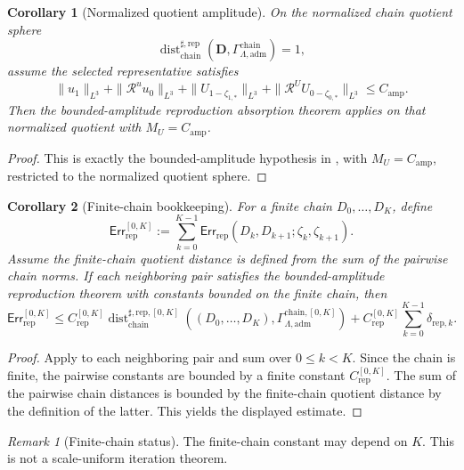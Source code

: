 \documentclass[11pt]{article}
\numberwithin{equation}{section}
\newtheorem{corollary}[corollary]{Corollary}
\theoremstyle{definition}
\theoremstyle{remark}
\newtheorem{remark}[remark]{Remark}
\newcommand{\adm}{\mathrm{adm}}
\newcommand{\rep}{\mathrm{rep}}
\newcommand{\chain}{\mathrm{chain}}
\newcommand{\Err}{\mathsf{Err}}
\newcommand{\Dist}{\operatorname{dist}}
\newcommand{\calR}{\mathcal R}
\newcommand{\bD}{\mathbf D}
\newcommand{\Gchain}{\Gamma_{\Lambda,\adm}^{\chain}}
\begin{document}
\begin{corollary}[Normalized quotient amplitude]
\label{rep:cor:normalized-chain-amplitude}
On the normalized chain quotient sphere
\[
    \Dist_{\chain}^{\sharp,\rep}(\bD,\Gchain)=1,
\]
assume the selected representative satisfies
\[
    \|u_1\|_{L^3}
    +
    \|\calR^u u_0\|_{L^3}
    +
    \|U_{1-\zeta_{1,*}}\|_{L^3}
    +
    \|\calR^U U_{0-\zeta_{0,*}}\|_{L^3}
    \le
    C_{\mathrm{amp}}.
\]
Then the bounded-amplitude reproduction absorption theorem applies on that
normalized quotient
with \(M_U=C_{\mathrm{amp}}\).
\end{corollary}

\begin{proof}
This is exactly the bounded-amplitude hypothesis in
, with
\(M_U=C_{\mathrm{amp}}\), restricted to the normalized quotient sphere.
\end{proof}

\begin{corollary}[Finite-chain bookkeeping]
\label{rep:cor:finite-chain-bookkeeping}
For a finite chain \(D_0,\ldots,D_K\), define
\[
    \Err_{\rep}^{[0,K]}
    :=
    \sum_{k=0}^{K-1}
    \Err_{\rep}(D_k,D_{k+1};\zeta_k,\zeta_{k+1}).
\]
Assume the finite-chain quotient distance is defined from the sum of the
pairwise chain norms.  If each neighboring pair satisfies the
bounded-amplitude reproduction theorem with constants bounded on the finite
chain, then
\[
    \Err_{\rep}^{[0,K]}
    \le
    C_{\rep}^{[0,K]}
    \Dist_{\chain}^{\sharp,\rep,[0,K]}
    ((D_0,\ldots,D_K),\Gamma_{\Lambda,\adm}^{\chain,[0,K]})
    +
    C_{\rep}^{[0,K]}
    \sum_{k=0}^{K-1}\delta_{\rep,k}.
\]
\end{corollary}

\begin{proof}
Apply  to each neighboring
pair and sum over \(0\le k<K\).  Since the chain is finite, the pairwise
constants are bounded by a finite constant \(C_{\rep}^{[0,K]}\).  The sum of
the pairwise chain distances is bounded by the finite-chain quotient distance
by the definition of the latter.  This yields the displayed estimate.
\end{proof}

\begin{remark}[Finite-chain status]
The finite-chain constant may depend on \(K\).  This is not a scale-uniform
iteration theorem.
\end{remark}
\end{document}
